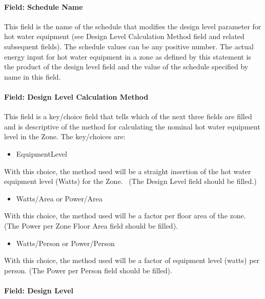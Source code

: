 \paragraph{Field: Schedule Name}\label{field-schedule-name-3-000}

This field is the name of the schedule that modifies the design level parameter for hot water equipment (see Design Level Calculation Method field and related subsequent fields). The schedule values can be any positive number. The actual energy input for hot water equipment in a zone as defined by this statement is the product of the design level field and the value of the schedule specified by name in this field.

\paragraph{Field: Design Level Calculation Method}\label{field-design-level-calculation-method-3}

This field is a key/choice field that tells which of the next three fields are filled and is descriptive of the method for calculating the nominal hot water equipment level in the Zone. The key/choices are:

\begin{itemize}
\tightlist
\item
  EquipmentLevel
\end{itemize}

With this choice, the method used will be a straight insertion of the hot water equipment level (Watts) for the Zone.~ (The Design Level field should be filled.)

\begin{itemize}
\tightlist
\item
  Watts/Area or Power/Area
\end{itemize}

With this choice, the method used will be a factor per floor area of the zone. (The Power per Zone Floor Area field should be filled).

\begin{itemize}
\tightlist
\item
  Watts/Person or Power/Person
\end{itemize}

With this choice, the method used will be a factor of equipment level (watts) per person. (The Power per Person field should be filled).

\paragraph{Field: Design Level}\label{field-design-level-2-000}

